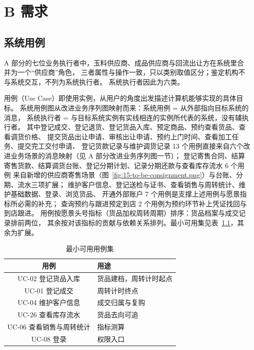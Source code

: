 \chapter{B 需求}

\section{系统用例}

A 部分的七位业务执行者中，玉料供应商、成品供应商与回流出让方在系统里合并为一个“供应商”角色，
三者属性与操作一致，只以类别取值区分；鉴定机构不与系统交互，不列为系统执行者。
系统执行者因此为六类。

用例（Use Case）即使用实例，从用户的角度出发描述计算机能够实现的具体目标。
系统用例图从改进业务序列图映射而来：系统用例 = 从外部指向目标系统的消息，
系统执行者 = 与目标系统实例有实线相连的实例所代表的系统，没有辅执行者。
其中登记成交、登记退货、登记货品入库、预定商品、预约查看货品、查看调货价格、
提交货品出让申请、审核出让申请、预约上门时间、查看加工任务、提交完工交付申请、
登记货款记录与维护调货记录 13 个用例直接来自六个改进业务场景的消息映射（见 A 部分改进业务序列图一节）；
登记寄售合同、结算寄售货款、结算调货台账、登记分期计划、记录分期还款与查看库存流水 6 个用例
来自新增的供应商寄售场景（图~\ref{fig:15-to-be-consignment.png}）与台账、分期、流水三项扩展；
维护客户信息、登记送检与证书、查看销售与周转统计、维护基础数据、登录、浏览货品、
开通外部账户 7 个用例是支撑上述用例与愿景指标所必需的补充；
查询预约与跟进预定到店 2 个用例为预约环节补上凭证找回与到店跟进。
用例按愿景头号指标（货品加权周转周期）排序：货品档案与成交记录排前两位，
其余按对该指标的贡献与依赖关系排列。最小可用集见表~\ref{tab:mvp-uc}，其余为扩展。

\begin{table}[H]\centering\small
\caption{最小可用用例集}\label{tab:mvp-uc}
\begin{tabular}{c l}
\toprule
用例 & 用途 \\
\midrule
UC-02 登记货品入库 & 货品建档，周转计时起点 \\
UC-01 登记成交 & 周转计时终点 \\
UC-04 维护客户信息 & 成交归属与复购 \\
UC-26 查看库存流水 & 货品去向可追 \\
UC-06 查看销售与周转统计 & 指标测算 \\
UC-08 登录 & 权限入口 \\
\bottomrule
\end{tabular}
\end{table}


